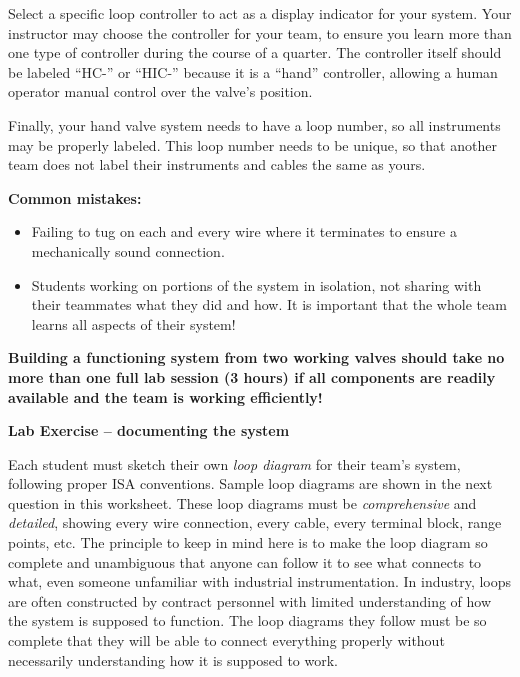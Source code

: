 Select a specific loop controller to act as a display indicator for your system.  Your instructor may choose the controller for your team, to ensure you learn more than one type of controller during the course of a quarter.  The controller itself should be labeled ``HC-'' or ``HIC-'' because it is a ``hand'' controller, allowing a human operator manual control over the valve's position. 

Finally, your hand valve system needs to have a loop number, so all instruments may be properly labeled.  This loop number needs to be unique, so that another team does not label their instruments and cables the same as yours.  

\vskip 10pt

{\bf Common mistakes:}

\begin{itemize}
\item{} Failing to tug on each and every wire where it terminates to ensure a mechanically sound connection.
\item{} Students working on portions of the system in isolation, not sharing with their teammates what they did and how.  It is important that the whole team learns all aspects of their system!
\end{itemize}

\vskip 10pt

{\bf Building a functioning system from two working valves should take no more than one full lab session (3 hours) if all components are readily available and the team is working efficiently!}





\vfil \eject

\noindent
{\bf Lab Exercise -- documenting the system}

\vskip 5pt

Each student must sketch their own {\it loop diagram} for their team's system, following proper ISA conventions.  Sample loop diagrams are shown in the next question in this worksheet.  These loop diagrams must be {\it comprehensive} and {\it detailed}, showing every wire connection, every cable, every terminal block, range points, etc.  The principle to keep in mind here is to make the loop diagram so complete and unambiguous that anyone can follow it to see what connects to what, even someone unfamiliar with industrial instrumentation.  In industry, loops are often constructed by contract personnel with limited understanding of how the system is supposed to function.  The loop diagrams they follow must be so complete that they will be able to connect everything properly without necessarily understanding how it is supposed to work.

